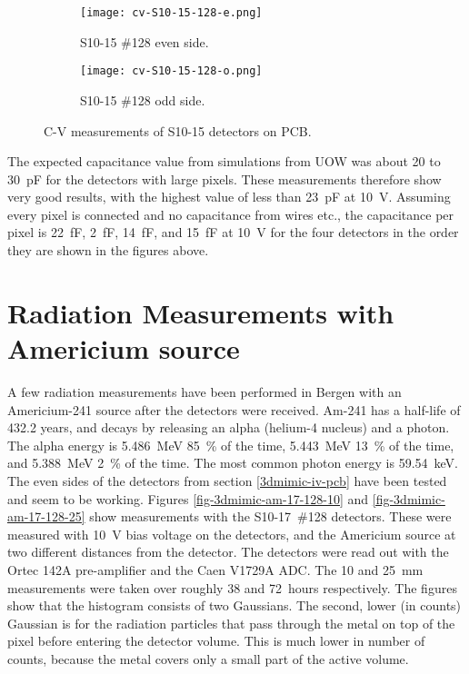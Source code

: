 \documentclass[../main/thesis.tex]{subfiles}
\begin{document}
\begin{figure}
	\centering
	\begin{subfigure}{.5\textwidth}
		\centering
		\texttt{[image: cv-S10-15-128-e.png]}
		\caption{S10-15 \#128 even side.}
		\label{fig-cv-S10-15-128-e}
	\end{subfigure}%
	\begin{subfigure}{.5\textwidth}
		\centering
		\texttt{[image: cv-S10-15-128-o.png]}
		\caption{S10-15 \#128 odd side.}
		\label{fig-cv-S10-15-128-o}
	\end{subfigure}
	\caption{C-V measurements of S10-15 detectors on PCB.}
	\label{fig-3d-cv-S10-15}
\end{figure}

The expected capacitance value from simulations from \gls{UOW} was about 20 to 30~pF for the detectors with large pixels. These measurements therefore show very good results, with the highest value of less than 23~pF at 10~V. Assuming every pixel is connected and no capacitance from wires etc., the capacitance per pixel is 22~fF, 2~fF, 14~fF, and 15~fF at 10~V for the four detectors in the order they are shown in the figures above. 

\section{Radiation Measurements with Americium source}

A few radiation measurements have been performed in Bergen with an Americium-241 source after the detectors were received. Am-241 has a half-life of 432.2 years, and decays by releasing an alpha (helium-4 nucleus) and a photon. The alpha energy is 5.486~MeV 85~\% of the time, 5.443~MeV 13~\% of the time, and 5.388~MeV 2~\% of the time. The most common photon  energy is 59.54~keV. \citep{Lund} The even sides of the detectors from section \ref{3dmimic-iv-pcb} have been tested and seem to be working. Figures \ref{fig-3dmimic-am-17-128-10} and \ref{fig-3dmimic-am-17-128-25} show measurements with the S10-17~\#128 detectors. These were measured with 10~V bias voltage on the detectors, and the Americium source at two different distances from the detector. The detectors were read out with the Ortec 142A pre-amplifier and the Caen V1729A ADC. The 10 and 25~mm measurements were taken over roughly 38 and 72~hours respectively. The figures show that the histogram consists of two Gaussians. The second, lower (in counts) Gaussian is for the radiation particles that pass through the metal on top of the pixel before entering the detector volume. This is much lower in number of counts, because the metal covers only a small part of the active volume. 
\end{document}
